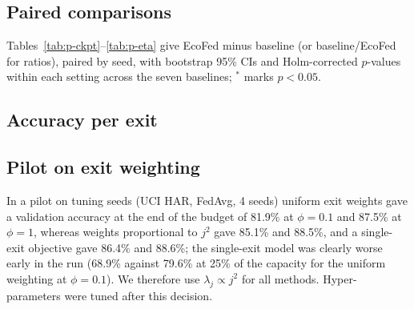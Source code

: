 \subsection{Paired comparisons}\label{app:paired}
Tables~\ref{tab:p-ckpt}--\ref{tab:p-eta} give EcoFed minus baseline (or baseline/EcoFed for ratios), paired by seed, with bootstrap 95\% CIs and Holm-corrected $p$-values within each setting across the seven baselines; $^*$ marks $p<0.05$.
\begin{table}[h]\centering\scriptsize\caption{Best-checkpoint accuracy, EcoFed minus baseline (pp).}\label{tab:p-ckpt}\resizebox{\textwidth}{!}{}\end{table}
\begin{table}[h]\centering\scriptsize\caption{Final accuracy, EcoFed minus baseline (pp).}\label{tab:p-final}\resizebox{\textwidth}{!}{}\end{table}
\begin{table}[h]\centering\scriptsize\caption{Total fleet energy used, ratio baseline/EcoFed.}\label{tab:p-energy}\resizebox{\textwidth}{!}{}\end{table}
\begin{table}[h]\centering\scriptsize\caption{Energy to reach 90\% of the plateau, ratio baseline/EcoFed (seeds that reach it in both).}\label{tab:p-eta}\resizebox{\textwidth}{!}{}\end{table}

\subsection{Accuracy per exit}
\begin{table}[h]\centering\scriptsize\caption{Test accuracy (\%) of each exit at the end of training, $\phi=0.25$, mean over 16 seeds. Single-exit FedAvg trains only the last exit.}\label{tab:exits}\resizebox{0.8\textwidth}{!}{}\end{table}

\subsection{Pilot on exit weighting}
In a pilot on tuning seeds (UCI HAR, FedAvg, 4 seeds) uniform exit weights gave a validation accuracy at the end of the budget of 81.9\% at $\phi=0.1$ and 87.5\% at $\phi=1$, whereas weights proportional to $j^2$ gave 85.1\% and 88.5\%, and a single-exit objective gave 86.4\% and 88.6\%; the single-exit model was clearly worse early in the run (68.9\% against 79.6\% at 25\% of the capacity for the uniform weighting at $\phi=0.1$). We therefore use $\lambda_j\propto j^2$ for all methods. Hyper-parameters were tuned after this decision.

